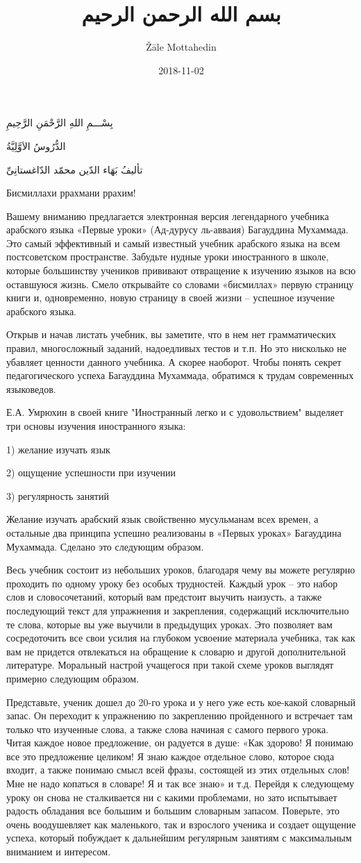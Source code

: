 \documentclass[a5paper]{article}
\title{بسم الله الرحمن الرحيم}
\author{Žāle Mottahedin}
\date{2018-11-02}
\begin{document}
بِسْـــمِ اللهِ الرَّحْمَنِ الرَّحِيمِ

الدُّرُوسُ الاَوَّلِيَّةُ

تأليفُ بَهَاء الدّين محمّد الدّاغستانِىِّ

Бисмиллахи ррахмани ррахим!

Вашему вниманию предлагается электронная версия легендарного учебника арабского языка «Первые уроки» (Ад-дурусу ль-авваия) Багауддина Мухаммада. Это самый эффективный и самый известный учебник арабского языка на всем постсоветском пространстве. Забудьте нудные уроки иностранного в школе, которые большинству учеников прививают отвращение к изучению языков на всю оставшуюся жизнь. Смело открывайте со словами «бисмиллах» первую страницу книги и, одновременно, новую страницу в своей жизни – успешное изучение арабского языка. 

Открыв и начав листать учебник, вы заметите, что в нем нет грамматических правил, многосложный заданий, надоедливых тестов и т.п. Но это нисколько не убавляет ценности данного учебника. А скорее наоборот. Чтобы понять секрет педагогического успеха Багауддина Мухаммада, обратимся к трудам современных языковедов.

Е.А. Умрюхин в своей книге "Иностранный легко и с удовольствием" выделяет три основы изучения иностранного языка: 

1) желание изучать язык 

2) ощущение успешности при изучении 

3) регулярность занятий

Желание изучать арабский язык свойственно мусульманам всех времен, а остальные два принципа успешно реализованы в «Первых уроках» Багауддина Мухаммада. Сделано это следующим образом.

Весь учебник состоит из небольших уроков, благодаря чему вы можете регулярно проходить по одному уроку без особых трудностей. Каждый урок – это набор слов и словосочетаний, который вам предстоит выучить наизусть, а также последующий текст для упражнения и закрепления, содержащий исключительно те слова, которые вы уже выучили в предыдущих уроках. Это позволяет вам сосредоточить все свои усилия на глубоком усвоение материала учебника, так как вам не придется отвлекаться на обращение к словарю и другой дополнительной литературе. Моральный настрой учащегося при такой схеме уроков выглядят примерно следующим образом.

Представьте, ученик дошел до 20-го урока и у него уже есть кое-какой словарный запас. Он переходит к упражнению по закреплению пройденного и встречает там только что изученные слова, а также слова начиная с самого первого урока. Читая каждое новое предложение, он радуется в душе: «Как здорово! Я понимаю все это предложение целиком! Я знаю каждое отдельное слово, которое сюда входит, а также понимаю смысл всей фразы, состоящей из этих отдельных слов! Мне не надо копаться в словаре! Я и так все знаю» и т.д. Перейдя к следующему уроку он снова не сталкивается ни с какими проблемами, но зато испытывает радость обладания все большим и большим словарным запасом. Поверьте, это очень воодушевляет как маленького, так и взрослого ученика и создает ощущение успеха, который побуждает к дальнейшим регулярным занятиям с максимальным вниманием и интересом.
\end{document}
